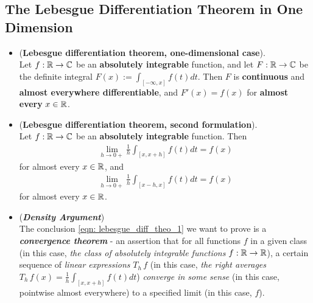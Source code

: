 \documentclass[11pt]{article}
\begin{document}
\subsection{The Lebesgue Differentiation Theorem in One Dimension}
\begin{itemize}
\item \begin{theorem} (\textbf{Lebesgue differentiation theorem, one-dimensional case}). \\
Let $f: {\mathbb R} \rightarrow {\mathbb C}$ be an \textbf{absolutely integrable} function, and let $F: {\mathbb R} \rightarrow {\mathbb C}$ be the definite integral $F(x) := \int_{[-\infty,x]} f(t) dt$. Then $F$ is \textbf{continuous} and \textbf{almost everywhere differentiable}, and $F'(x) = f(x)$ for \textbf{almost every} $x \in {\mathbb R}$.
\end{theorem}

\item \begin{theorem} (\textbf{Lebesgue differentiation theorem, second formulation}). \\
Let $f: {\mathbb R} \rightarrow {\mathbb C}$ be an \textbf{absolutely integrable} function. Then
\begin{align}
 \lim\limits_{h\rightarrow 0+}\frac{1}{h} \int_{[x,x+h]} f(t) dt = f(x) \label{eqn: lebesgue_diff_theo_1}
\end{align} for almost every $x \in {\mathbb R}$, and
\begin{align}
 \lim\limits_{h\rightarrow 0+}\frac{1}{h} \int_{[x-h,x]} f(t) dt = f(x) \label{eqn: lebesgue_diff_theo_2}
\end{align} for almost every $x \in {\mathbb R}$.
\end{theorem}

\item \begin{remark} (\emph{\textbf{Density Argument}}) \citep{tao2011introduction} \\
The conclusion \eqref{eqn: lebesgue_diff_theo_1} we want to prove is a \emph{\textbf{convergence theorem}} - an assertion that for all functions $f$ in a given class (in this case, \emph{the class of absolutely integrable functions} $f : {\mathbb R} \rightarrow {\mathbb R}$), a certain sequence of \emph{linear expressions} $T_h\,f$ (in this case, \textit{the right averages} $T_h\,f(x) = \frac{1}{h} \int_{[x,x+h]} f(t) dt$) \emph{converge in some sense} (in this case, pointwise almost everywhere) to a specified limit (in this case, $f$).


\end{remark}
\end{itemize}
\end{document}
